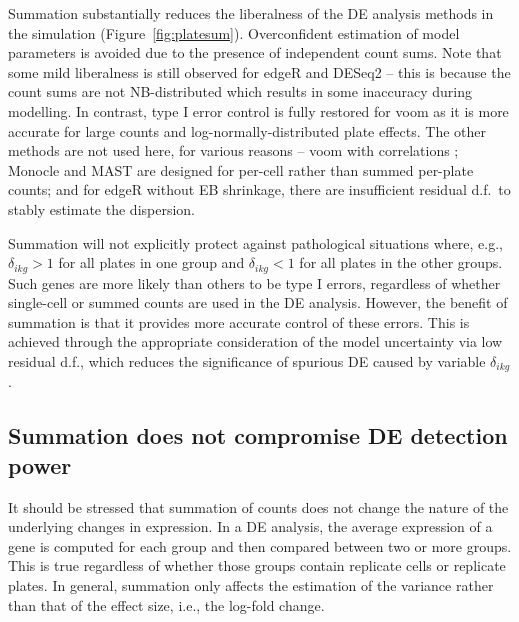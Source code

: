 \documentclass[oupdraft]{bio}
\begin{document}
Summation substantially reduces the liberalness of the DE analysis methods in the simulation (Figure~\ref{fig:platesum}).
Overconfident estimation of model parameters is avoided due to the presence of independent count sums.
Note that some mild liberalness is still observed for edgeR and DESeq2 
    -- this is because the count sums are not NB-distributed which results in some inaccuracy during modelling.
In contrast, type I error control is fully restored for voom as it is more accurate for large counts and log-normally-distributed plate effects.
The other methods are not used here, for various reasons -- voom with correlations ;
    Monocle and MAST are designed for per-cell rather than summed per-plate counts;
    and for edgeR without EB shrinkage, there are insufficient residual d.f.\ to stably estimate the dispersion.

Summation will not explicitly protect against pathological situations where, e.g., $\delta_{ikg} > 1$ for all plates in one group and $\delta_{ikg} < 1$ for all plates in the other groups.
Such genes are more likely than others to be type I errors, regardless of whether single-cell or summed counts are used in the DE analysis.
However, the benefit of summation is that it provides more accurate control of these errors.
This is achieved through the appropriate consideration of the model uncertainty via low residual d.f., which reduces the significance of spurious DE caused by variable $\delta_{ikg}$.

\subsection{Summation does not compromise DE detection power}
It should be stressed that summation of counts does not change the nature of the underlying changes in expression.
In a DE analysis, the average expression of a gene is computed for each group and then compared between two or more groups.
This is true regardless of whether those groups contain replicate cells or replicate plates. 
In general, summation only affects the estimation of the variance rather than that of the effect size, i.e., the log-fold change.
\end{document}
